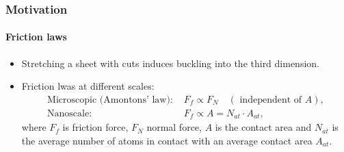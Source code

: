\documentclass[
	10pt, %
]{beamer}
\begin{document}
\begin{frame}

\end{frame}


\begin{frame}
	\frametitle{Motivation}
	\framesubtitle{Friction laws}

	\begin{itemize}
		\item Stretching a sheet with cuts induces buckling into the third dimension. 
		\item Friction lwas at different scales:
		\begin{align*}
			\text{Microscopic (Amontons’ law): } &F_f \propto F_N \quad (\text{ independent of } A), \\
			\text{Nanoscale: } &F_f \propto A = N_{at} \cdot A_{at},  
		\end{align*}
		where $F_f$ is friction force, $F_N$ normal force, $A$ is the contact area and $N_{at}$ is the average number of atoms in contact with an average contact area ${A_{at}}$.
		
		
	\end{itemize}
	
\end{frame}
\end{document}
